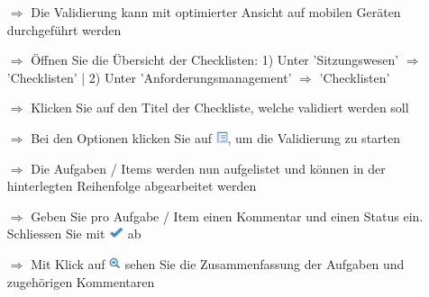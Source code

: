 \documentclass{article}
\begin{document}
\begin{multicols}{2}

\begin{tcolorbox}[colback=blue!5,colframe=blue!40!black,title=Checkliste validieren]
\begin{itemize}
	\item[$\Longrightarrow$] Die Validierung kann mit optimierter Ansicht auf mobilen Geräten durchgeführt werden
  \item[$\Longrightarrow$] Öffnen Sie die Übersicht der Checklisten: 1) Unter 'Sitzungswesen' $\Rightarrow$ 'Checklisten' | 2) Unter 'Anforderungsmanagement' $\Longrightarrow$ 'Checklisten'
	\item[$\Longrightarrow$] Klicken Sie auf den Titel der Checkliste, welche validiert werden soll
	\item[$\Longrightarrow$] Bei den Optionen klicken Sie auf \includegraphics[height=10pt]{Icons/Listensymbol.png}, um die Validierung zu starten
	\item[$\Longrightarrow$] Die Aufgaben / Items werden nun aufgelistet und können	in der hinterlegten Reihenfolge abgearbeitet werden
	\item[$\Longrightarrow$] Geben Sie pro Aufgabe / Item einen Kommentar und einen Status ein. Schliessen Sie mit \includegraphics[height=10pt]{Icons/Gutzeichen.png} ab
	\item[$\Longrightarrow$] Mit Klick auf \includegraphics[height=10pt]{Icons/Lupe.png} sehen Sie die Zusammenfassung der Aufgaben und zugehörigen Kommentaren
\end{itemize}
\end{tcolorbox}

\end{multicols}

\end{document}
